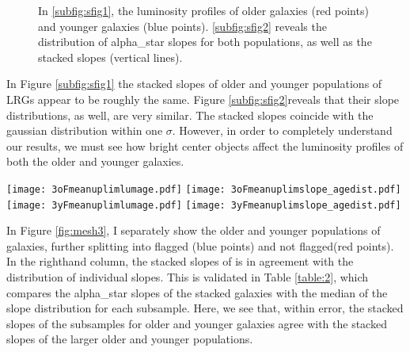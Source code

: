 \documentclass{article}
\begin{document}
\begin{figure}[ht!]
\hfill
{}
 \caption{In \ref{subfig:sfig1}, the luminosity profiles of older galaxies (red points) and younger galaxies (blue points). \ref{subfig:sfig2} reveals the distribution of alpha\_star slopes for both populations, as well as the stacked slopes (vertical lines).}
\label{fig:mesh2}
\end{figure}


In Figure \ref{subfig:sfig1}  the stacked slopes of older and younger populations of LRGs appear to be roughly the same. Figure \ref{subfig:sfig2}reveals that their slope distributions, as well, are very similar.  The stacked slopes coincide with the gaussian distribution within one $\sigma$. However, in order to completely understand our results, we must see how bright center objects affect the luminosity profiles of both the older and younger galaxies.

\begin{figure*}[h!]
\texttt{[image: 3oFmeanuplimlumage.pdf]}
\label{subfig:sfig3}
\texttt{[image: 3oFmeanuplimslope\_agedist.pdf]}
\label{subfig:sfig4}
\texttt{[image: 3yFmeanuplimlumage.pdf]}
\label{subfig:sfig5}
\texttt{[image: 3yFmeanuplimslope\_agedist.pdf]}
\label{subfig:sfig6}
\caption{The left\-hand column shows the luminosity profiles of older (upper) and younger (lower) galaxies. Flagged Bright Object Centers are blue points and Not Flagged are red points. The right\-hand column shows the alpha\_star distribution amongst galaxies for flagged (blue bars) and not flagged (red bars). The stacked slopes are represented by the magenta and cyan vertical lines.}
\label{fig:mesh3}
\end{figure*}

In Figure \ref{fig:mesh3}, I separately show the older and younger populations of galaxies, further splitting into flagged (blue points) and not flagged(red points). In the right\-hand column, the stacked slopes of is in agreement with the distribution of individual slopes. This is validated in Table \ref{table:2}, which compares the alpha\_star slopes of the stacked galaxies with the median of the slope distribution for each subsample. Here, we see that, within error, the stacked slopes of the subsamples for older and younger galaxies agree with the stacked slopes of the larger older and younger populations.
\end{document}
